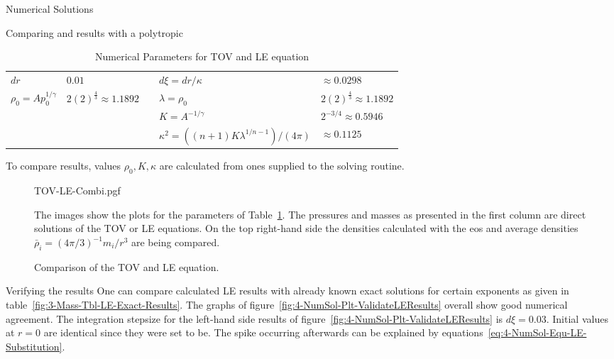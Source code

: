 \begin{section}{Numerical Solutions}
\begin{subsection}{Comparing \texorpdfstring{}{TOV} and \texorpdfstring{}{LE} results with a polytropic \texorpdfstring{}{EoS}}
\begin{table}
{\begin{tabular}{@{}llcll@{}}
		$dr$ & $0.01$ && $d\xi=dr/\kappa$ & $\approx0.0298$\\
		\cmidrule{1-2} \cmidrule{4-5}
		$\rho_0=Ap_0^{1/\gamma}$ & $2(2)^{\frac{4}{3}}\approx1.1892$ && $\lambda=\rho_0$ & $2(2)^{\frac{4}{3}}\approx1.1892$\\
		&&& $K=A^{-1/\gamma}$ & $2^{-3/4}\approx0.5946$\\
		&&& $\kappa^2=((n+1)K\lambda^{1/n-1})/(4\pi)$ & $\approx0.1125$\\
		\bottomrule
	\end{tabular}
	}
	\caption[Numerical Parameters for  and LE equation]{Numerical Parameters for \ac{TOV} and \ac{LE} equation}
	\label{tab:4-NumSol-Tbl-TOVParameters}
	\small
	To compare results, values $\rho_0,K,\kappa$ are calculated from ones supplied to the solving routine.
\end{table}%
\begin{figure}[H]
	{\centering
	{TOV-LE-Combi.pgf}
	}%
	\caption[Comparison of the  and  equation]{Comparison of the \ac{TOV} and \ac{LE} equation.}
	\label{fig:4-NumSol-Plt-TOVEqEasyEOS}
	\small
	The images show the plots for the parameters of Table~\ref{tab:4-NumSol-Tbl-TOVParameters}.
	The pressures and masses as presented in the first column are direct solutions of the \ac{TOV} or \ac{LE} equations.
	On the top right-hand side the densities calculated with the \ac{eos} and average densities $\bar{\rho}_i=(4\pi/3)^{-1}m_i/r^3$ are being compared.
\end{figure}
\end{subsection}
%
%
\begin{subsection}{Verifying the results}
\label{subsec:4-NumSol-Sec-Verifiying-the-results}
One can compare calculated \ac{LE} results with already known exact  solutions for certain exponents as given in table~\ref{fig:3-Mass-Tbl-LE-Exact-Results}.
The graphs of figure~\ref{fig:4-NumSol-Plt-ValidateLEResults} overall show good numerical agreement.
The integration stepsize for the left-hand side results of figure~\ref{fig:4-NumSol-Plt-ValidateLEResults} is $d\xi=0.03$.
Initial values at $r=0$ are identical since they were set to be.
The spike occurring afterwards can be explained by equations~\eqref{eq:4-NumSol-Equ-LE-Substitution}.

\end{subsection}
\end{section}
